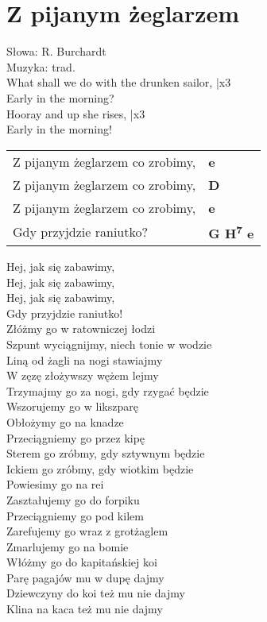\section{Z pijanym żeglarzem}

Słowa: R. Burchardt\\
Muzyka:  trad.\\

What shall we do with the drunken sailor,  |x3 \\
Early in the morning? \\
Hooray and up she rises,  |x3 \\
Early in the morning! \\

\vspace{1em}
\begin{tabular}{@{}p{7cm}@{}l@{}}
Z pijanym żeglarzem co zrobimy, & \bfseries e \\
Z pijanym żeglarzem co zrobimy, & \bfseries D \\
Z pijanym żeglarzem co zrobimy, & \bfseries e \\
Gdy przyjdzie raniutko? & \bfseries G H\textsuperscript{7} e \\
\end{tabular}

\vspace{1em}
Hej, jak się zabawimy, \\
Hej, jak się zabawimy, \\
Hej, jak się zabawimy, \\
Gdy przyjdzie raniutko! \\


Złóżmy go w ratowniczej łodzi \\
Szpunt wyciągnijmy, niech tonie w wodzie \\
Liną od żagli na nogi stawiajmy \\
W zęzę złożywszy wężem lejmy \\
Trzymajmy go za nogi, gdy rzygać będzie \\
Wszorujemy go w likszparę \\
Obłożymy go na knadze \\
Przeciągniemy go przez kipę \\
Sterem go zróbmy, gdy sztywnym będzie \\
Ickiem go zróbmy, gdy wiotkim będzie \\
Powiesimy go na rei \\
Zaształujemy go do forpiku \\
Przeciągniemy go pod kilem \\
Zarefujemy go wraz z grotżaglem \\
Zmarlujemy go na bomie \\
Włóżmy go do kapitańskiej koi \\
Parę pagajów mu w dupę dajmy \\
Dziewczyny do koi też mu nie dajmy \\
Klina na kaca też mu nie dajmy \\
